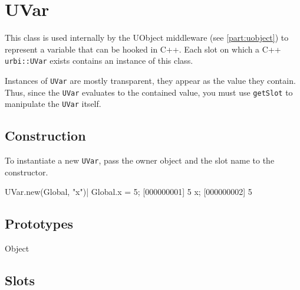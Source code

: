 
\section{UVar}

This class is used internally by the UObject middleware
(see \autoref{part:uobject}) to represent a variable
that can be hooked in C++. Each slot on which a C++ \lstinline|urbi::UVar|
exists contains an instance of this class.

Instances of \lstinline|UVar| are mostly transparent, they appear as
the value they contain. Thus, since the \lstinline|UVar| evaluates to the
contained value, you must use \lstinline|getSlot| to manipulate the
\lstinline|UVar| itself.

\subsection{Construction}
To instantiate a new \lstinline|UVar|, pass the owner object and the slot
name to the constructor.
\begin{urbiscript}
UVar.new(Global, "x")|
Global.x = 5;
[000000001] 5
x;
[000000002] 5
\end{urbiscript}

\subsection{Prototypes}
\begin{refObjects}
\item[Object]
\end{refObjects}

\subsection{Slots}

